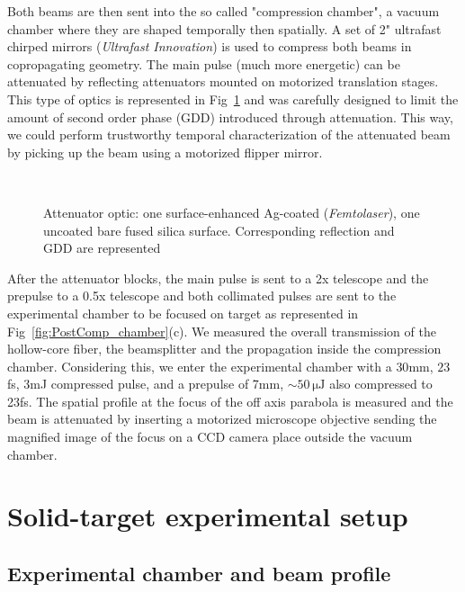 \noindent  Both beams are then sent into the so called "compression chamber", a vacuum chamber where they are shaped temporally then spatially. A set of 2" ultrafast chirped mirrors (\textit{Ultrafast Innovation}) is used to compress both beams in copropagating geometry.
The main pulse (much more energetic) can be attenuated by reflecting attenuators mounted on motorized translation stages. This type of optics is represented in Fig~\ref{fig:attenuateur} and was carefully designed to limit the amount of second order phase (GDD) introduced through attenuation. This way, we could perform trustworthy temporal characterization of the attenuated beam by picking up the beam using a motorized flipper mirror.\\

\begin{figure}[H]
\centering
{}\\
\caption{\label{fig:attenuateur}Attenuator optic: one surface-enhanced Ag-coated (\textit{Femtolaser}), one uncoated bare fused silica surface. Corresponding reflection and GDD are represented}
\end{figure}


\noindent  After the attenuator blocks, the main pulse is sent to a 2x telescope and the prepulse to a 0.5x telescope and both collimated pulses are sent to the experimental chamber to be focused on target as represented in Fig~\ref{fig:PostComp_chamber}(c).
We measured the overall transmission of the hollow-core fiber, the beamsplitter and the propagation inside the compression chamber. Considering this, we enter the experimental chamber with a $30$mm, $23$fs, 3mJ compressed pulse, and a prepulse of 7mm, $\sim 50\,\mathrm{\mu J}$ also compressed to 23fs.
The spatial profile at the focus of the off axis parabola is measured and the beam is attenuated by inserting a motorized microscope objective sending the magnified image of the focus on a CCD camera place outside the vacuum chamber. 





\section{Solid-target experimental setup}
\label{section:Solid target experimental set-up}

\subsection{Experimental chamber and beam profile}

